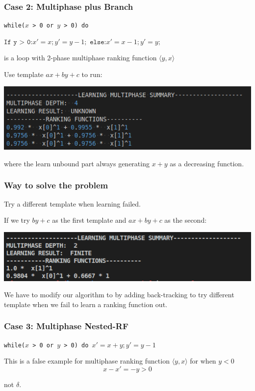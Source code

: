\documentclass[10pt]{beamer}
\begin{document}
\begin{frame}\frametitle{Case 2: Multiphase plus Branch}
\begin{example}
\texttt{while($x$ > 0 or $y$ > 0) do }

$\texttt{If y > 0:} x' = x; y' = y - 1;$
$\texttt{else:} x' = x - 1; y' = y;$


\end{example}

is a loop with 2-phase multiphase ranking function $\langle y, x\rangle$

Use template $ax + by + c$ to run:
\begin{center}
\includegraphics[scale= 0.5]{2.png}
\end{center}
where the learn unbound part always generating $x + y$ as a decreasing function.

\end{frame}

\begin{frame}\frametitle{Way to solve the problem}
Try a different template when learning failed.

If we try $by + c$ as the first template and $ax + by + c$ as the second:

\begin{center}

\includegraphics[scale= 0.5]{3.png}
\end{center}

We have to modify our algorithm to by adding back-tracking to try different template when we fail to learn a ranking function out. 
\end{frame}

\begin{frame}\frametitle{Case 3: Multiphase Nested-RF}
\begin{example}
\texttt{while($x$ > 0 or $y$ > 0) do }$x' = x + y; y' = y - 1$

This is a false example for multiphase ranking function $\langle y,x\rangle$ for when $y < 0$ 
\[ x - x' = -y > 0\]

not $\delta$.



\end{example}

\end{frame}
\end{document}
